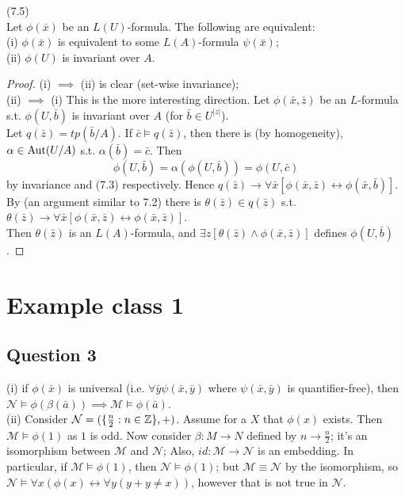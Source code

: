 \documentclass[a4paper]{article}
\begin{document}
\begin{prop} (7.5)\\
    Let $\phi(\bar{x})$ be an $L(U)$-formula. The following are equivalent:\\
    (i) $\phi(\bar{x})$ is equivalent to some $L(A)$-formula $\psi(\bar{x})$;\\
    (ii) $\phi(U)$ is invariant over $A$.
    \begin{proof}
        (i) $\implies$ (ii) is clear (set-wise invariance);\\
        (ii) $\implies$ (i) This is the more interesting direction. Let $\phi(\bar{x},\bar{z})$ be an $L$-formula s.t. $\phi(U,\bar{b})$ is invariant over $A$ (for $\bar{b} \in U^{|z|}$).\\
        Let $q(\bar{z}) = tp(\bar{b}/A)$. If $\bar{c} \vDash q(\bar{z})$, then there is (by homogeneity), $\alpha \in \operatorname{Aut} (U/A)$ s.t. $\alpha(\bar{b}) = \bar{c}$. Then 
        $$\phi(U,\bar{b}) = \alpha(\phi(U,\bar{b})) = \phi(U,\bar{c})$$
        by invariance and (7.3) respectively. Hence $q(\bar{z}) \to \forall \bar{x} [\phi(\bar{x},\bar{z}) \leftrightarrow \phi(\bar{x},\bar{b})]$. By (an argument similar to 7.2) there is $\theta(\bar{z}) \in q(\bar{z})$ s.t. $\theta(\bar{z}) \to \forall \bar{x}[\phi(\bar{x},\bar{z}) \leftrightarrow \phi(\bar{x},\bar{z})]$.\\
        Then $\theta(\bar{z})$ is an $L(A)$-formula, and $\exists z [\theta(\bar{z}) \wedge \phi(\bar{x},\bar{z})]$ defines $\phi(U,\bar{b})$.
    \end{proof}
\end{prop}


\newpage

\section{Example class 1}

\subsection{Question 3}
(i) if $\phi(\bar{x})$ is universal (i.e. $\forall \bar{y} \psi(\bar{x},\bar{y})$ where $\psi(\bar{x},\bar{y})$ is quantifier-free), then $\mathcal{N} \vDash \phi(\beta(\bar{a})) \implies \mathcal{M} \vDash \phi(\bar{a})$.\\
(ii) Consider $\mathcal{N} = (\{\frac{n}{2} : n \in \mathbb{Z} \},+)$. Assume for a $X$ that $\phi(x)$ exists. Then $\mathcal{M} \vDash \phi(1)$ as $1$ is odd. Now consider $\beta:M \to N$ defined by $n \to \frac{n}{2}$; it's an isomorphism between $\mathcal{M}$ and $\mathcal{N}$; Also, $id:\mathcal{M} \to \mathcal{N}$ is an embedding. In particular, if $\mathcal{M} \vDash \phi(1)$, then $\mathcal{N} \vDash \phi(1)$; but $\mathcal{M} \equiv \mathcal{N}$ by the isomorphism, so $\mathcal{N} \vDash \forall x (\phi(x) \leftrightarrow \forall y (y +y \neq x))$, however that is not true in $\mathcal{N}$.
\end{document}
